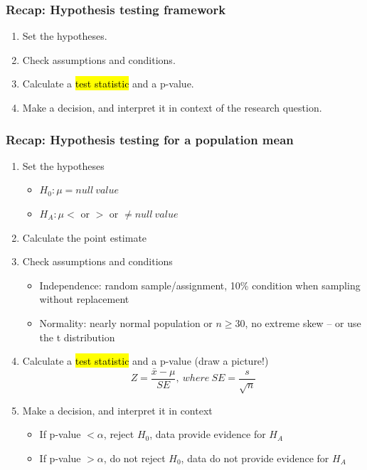 
\begin{frame}
\frametitle{Recap: Hypothesis testing framework}

\begin{enumerate}

\item Set the hypotheses.

\item Check assumptions and conditions.

\item Calculate a \hl{test statistic} and a p-value.

\item Make a decision, and interpret it in context of the research question.

\end{enumerate}

\end{frame}


\begin{frame}
\frametitle{Recap: Hypothesis testing for a population mean}

\begin{enumerate}

\item Set the hypotheses
\begin{itemize}
\item $H_0: \mu = null~value$
\item $H_A: \mu <$ or $>$ or $\ne null~value$
\end{itemize}

\item Calculate the point estimate

\item Check assumptions and conditions
\begin{itemize}
\item Independence: random sample/assignment, 10\% condition when sampling without replacement
\item Normality: nearly normal population or $n \ge 30$, no extreme skew -- or use the t distribution
\end{itemize}

\item Calculate a \hl{test statistic} and a p-value (draw a picture!)
\[ Z = \frac{\bar{x} - \mu}{SE},~where~SE = \frac{s}{\sqrt{n}} \]

\item Make a decision, and interpret it in context
\begin{itemize}
\item If p-value $< \alpha$, reject $H_0$, data provide evidence for $H_A$
\item If p-value $> \alpha$, do not reject $H_0$, data do not provide evidence for $H_A$
\end{itemize}

\end{enumerate}

\end{frame}

